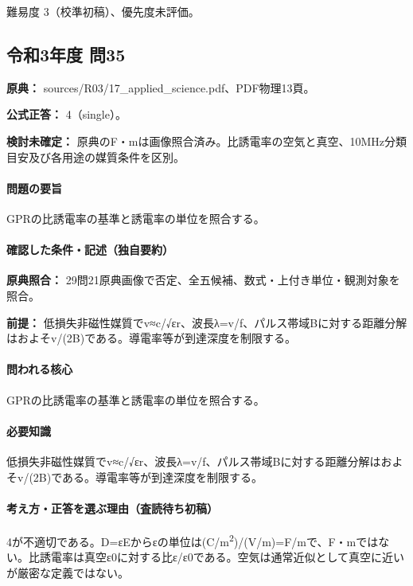 \par 難易度 3（校準初稿）、優先度未評価。

\subsection{令和3年度 問35}
\label{q:r03-reg-applied-35}

\noindent\textbf{原典：} sources/R03/17\_applied\_science.pdf、PDF物理13頁。

\textbf{公式正答：} 4（single）。

\par\textbf{検討未確定：} 原典のF・mは画像照合済み。比誘電率の空気と真空、10MHz分類目安及び各用途の媒質条件を区別。

\paragraph{問題の要旨} GPRの比誘電率の基準と誘電率の単位を照合する。

\paragraph{確認した条件・記述（独自要約）}\mbox{}\par

\noindent\textbf{原典照合：} 29問21原典画像で否定、全五候補、数式・上付き単位・観測対象を照合。\par

\noindent\textbf{前提：} 低損失非磁性媒質でv≈c/√εr、波長λ=v/f、パルス帯域Bに対する距離分解はおよそv/(2B)である。導電率等が到達深度を制限する。\par

\paragraph{問われる核心} GPRの比誘電率の基準と誘電率の単位を照合する。

\paragraph{必要知識} 低損失非磁性媒質でv≈c/√εr、波長λ=v/f、パルス帯域Bに対する距離分解はおよそv/(2B)である。導電率等が到達深度を制限する。

\paragraph{考え方・正答を選ぶ理由（査読待ち初稿）} 4が不適切である。D=εEからεの単位は(C/m\textsuperscript{2})/(V/m)=\allowbreak{}F/mで、F・mではない。比誘電率は真空ε0に対する比ε/ε0である。空気は通常近似として真空に近いが厳密な定義ではない。

